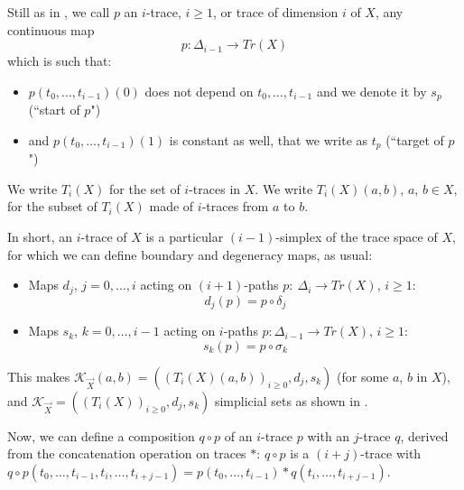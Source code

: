 \documentclass[a4paper,fleqn]{cas-sc}
\newcommand{\K}{\mathcal{K}}
\begin{document}
Still as in \cite{semi-ab},  
we call $p$ an $i$-trace, $i\geq 1$, or trace of dimension $i$ of $X$, any 
 continuous map 
$$p: \Delta_{i-1} \rightarrow Tr(X)$$ 
\noindent which is such that: 
\begin{itemize}
\item $p(t_0,\ldots,t_{i-1})(0)$ does not depend on $t_0,\ldots,t_{i-1}$ and we denote it by $s_p$ (``start of $p$")
\item and $p(t_0,\ldots,t_{i-1})(1)$ is constant as well, that we write as $t_p$ (``target of $p$")
\end{itemize}
We write $T_i(X)$ for the set of $i$-traces in $X$. We write $T_i(X)(a,b)$, $a$, $b \in X$, for the subset of $T_i(X)$ made of $i$-traces from $a$ to $b$. 

In short, an $i$-trace of $X$ is a particular $(i-1)$-simplex of the trace space of $X$, for which we can define boundary and degeneracy maps, as usual: 

\begin{itemize}
\item Maps $d_{j}$, $j=0,\ldots,i$ acting on $(i+1)$-paths %
$p: \ \Delta_i \rightarrow Tr(X)$, $i\geq 1$: %
$$d_j(p)=p\circ \delta_j$$
\item Maps $s_k$, $k=0,\ldots,i-1$ acting on $i$-paths 
$p: \Delta_{i-1} \rightarrow Tr(X)$, $i\geq 1$: %
$$s_k(p)=p\circ \sigma_k$$
\end{itemize}

This makes $\K_{\Vec{X}}(a,b)=((T_i(X)(a,b))_{i\geq 0},d_j,s_k)$ (for some $a$, $b$ in $X$), and $\K_{\Vec{X}}=((T_i(X))_{i\geq 0},d_j,s_k)$ simplicial sets as shown in \cite{semi-ab}. 

Now, we can define a composition $q\circ p$ of an $i$-trace $p$ with an $j$-trace $q$, derived from the concatenation operation on traces $*$: $q\circ p$ is a $(i+j)$-trace with $q\circ p(t_0,\ldots,t_{i-1},t_{i},\ldots,t_{i+j-1})=p(t_0,\ldots,t_{i-1})*q(t_i,\ldots,t_{i+j-1})$.
\end{document}
